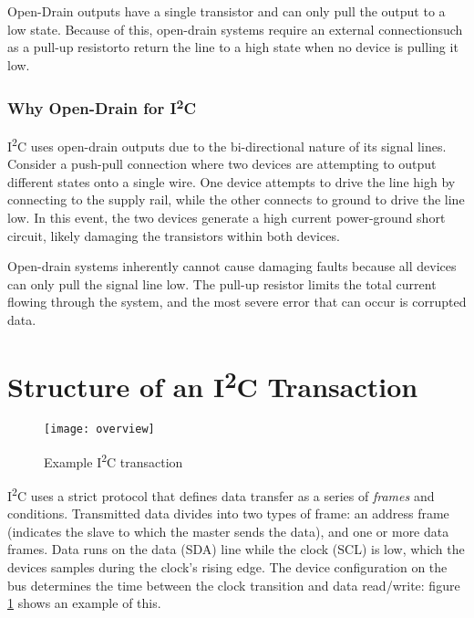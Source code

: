 \documentclass[openany,11pt,fleqn]{book} %
\begin{document}
        Open-Drain outputs have a single transistor and can only pull the output to a low state. Because of this, open-drain systems require an external connection\textemdash such as a pull-up resistor\textemdash to return the line to a high state when no device is pulling it low. 
        
        \subsubsection{\color{orange}Why Open-Drain for I\textsuperscript{2}C}
            I\textsuperscript{2}C uses open-drain outputs due to the bi-directional nature of its signal lines. Consider a push-pull connection where two devices are attempting to output different states onto a single wire. One device attempts to drive the line high by connecting to the supply rail, while the other connects to ground to drive the line low. In this event, the two devices generate a high current power-ground short circuit, likely damaging the transistors within both devices. 
            
            Open-drain systems inherently cannot cause damaging faults because all devices can only pull the signal line low. The pull-up resistor limits the total current flowing through the system, and the most severe error that can occur is corrupted data. 

\section{Structure of an I\textsuperscript{2}C Transaction}	
    
    \begin{figure}[]
        \centering\texttt{[image: overview]}
        \caption{Example I\textsuperscript{2}C transaction}
        \label{overview}
    \end{figure}
    
    I\textsuperscript{2}C uses a strict protocol that defines data transfer as a series of \textit{frames} and conditions.     
    Transmitted data divides into two types of frame: an address frame (indicates the slave to which the master sends the data), and one or more data frames. Data runs on the data (SDA) line while the clock (SCL) is low, which the devices samples during the clock's rising edge. The device configuration on the bus determines the time between the clock transition and data read/write: figure \ref{overview} shows an example of this. 
    
\end{document}
